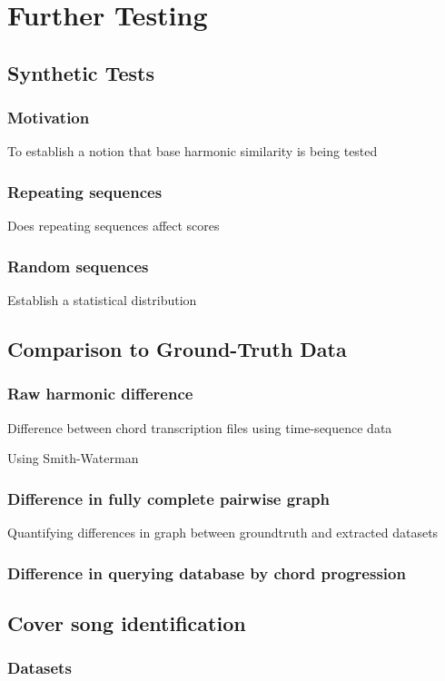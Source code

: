 \chapter{Further Testing}

\section{Synthetic Tests}

\subsection{Motivation}

\item To establish a notion that base harmonic similarity is being tested

\subsection{Repeating sequences}

\item Does repeating sequences affect scores

\subsection{Random sequences}

\item Establish a statistical distribution

\section{Comparison to Ground-Truth Data}

\subsection{Raw harmonic difference}

\item Difference between chord transcription files using time-sequence data

\item Using Smith-Waterman

\subsection{Difference in fully complete pairwise graph}

\item Quantifying differences in graph between groundtruth and extracted datasets

\subsection{Difference in querying database by chord progression}

\section{Cover song identification}

\subsection{Datasets}